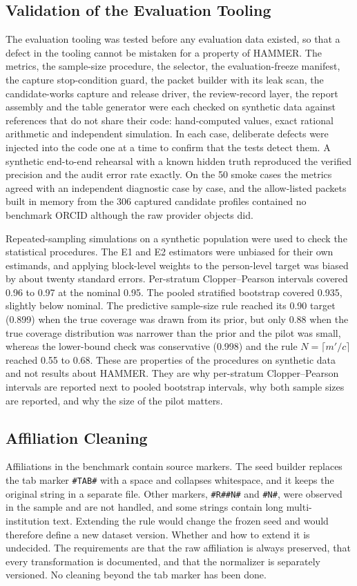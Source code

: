 \subsection{Validation of the Evaluation Tooling}
\label{sec:validation}
The evaluation tooling was tested before any evaluation data existed, so that a defect in the tooling cannot be mistaken for a property of HAMMER. The metrics, the sample-size procedure, the selector, the evaluation-freeze manifest, the capture stop-condition guard, the packet builder with its leak scan, the candidate-works capture and release driver, the review-record layer, the report assembly and the table generator were each checked on synthetic data against references that do not share their code: hand-computed values, exact rational arithmetic and independent simulation. In each case, deliberate defects were injected into the code one at a time to confirm that the tests detect them. A synthetic end-to-end rehearsal with a known hidden truth reproduced the verified precision and the audit error rate exactly. On the 50 smoke cases the metrics agreed with an independent diagnostic case by case, and the allow-listed packets built in memory from the 306 captured candidate profiles contained no benchmark ORCID although the raw provider objects did.

Repeated-sampling simulations on a synthetic population were used to check the statistical procedures. The E1 and E2 estimators were unbiased for their own estimands, and applying block-level weights to the person-level target was biased by about twenty standard errors. Per-stratum Clopper--Pearson intervals covered 0.96 to 0.97 at the nominal 0.95. The pooled stratified bootstrap covered 0.935, slightly below nominal. The predictive sample-size rule reached its 0.90 target (0.899) when the true coverage was drawn from its prior, but only 0.88 when the true coverage distribution was narrower than the prior and the pilot was small, whereas the lower-bound check was conservative (0.998) and the rule $N=\lceil m'/c\rceil$ reached 0.55 to 0.68. These are properties of the procedures on synthetic data and not results about HAMMER. They are why per-stratum Clopper--Pearson intervals are reported next to pooled bootstrap intervals, why both sample sizes are reported, and why the size of the pilot matters.

\subsection{Affiliation Cleaning}
\label{sec:affiliation}
Affiliations in the benchmark contain source markers. The seed builder replaces the tab marker \texttt{\#TAB\#} with a space and collapses whitespace, and it keeps the original string in a separate file. Other markers, \texttt{\#R\#\#N\#} and \texttt{\#N\#}, were observed in the sample and are not handled, and some strings contain long multi-institution text. Extending the rule would change the frozen seed and would therefore define a new dataset version. Whether and how to extend it is undecided. The requirements are that the raw affiliation is always preserved, that every transformation is documented, and that the normalizer is separately versioned. No cleaning beyond the tab marker has been done.


